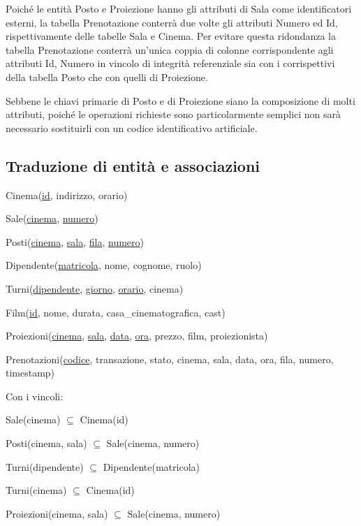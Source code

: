 Poiché le entità Posto e Proiezione hanno gli attributi di Sala come
identificatori esterni, la tabella Prenotazione conterrà due volte gli attributi
Numero ed Id, rispettivamente delle tabelle Sala e Cinema.
Per evitare questa ridondanza la tabella Prenotazione conterrà un'unica coppia
di colonne corrispondente agli attributi Id, Numero in vincolo di integrità
referenziale sia con i corrispettivi della tabella Posto che con quelli di
Proiezione.

Sebbene le chiavi primarie di Posto e di Proiezione siano la composizione di
molti attributi, poiché le operazioni richieste sono particolarmente semplici
non sarà necessario sostituirli con un codice identificativo artificiale.

\pagebreak
\subsection*{Traduzione di entità e associazioni}
%
%

Cinema(\underline{id}, indirizzo, orario)

Sale(\underline{cinema}, \underline{numero})

Posti(\underline{cinema},
\underline{sala},
\underline{fila},
\underline{numero})

Dipendente(\underline{matricola}, nome, cognome, ruolo)

Turni(\underline{dipendente}, \underline{giorno}, \underline{orario}, cinema)

Film(\underline{id}, nome, durata, casa\_cinematografica, cast)

Proiezioni(\underline{cinema},
\underline{sala},
\underline{data},
\underline{ora},
prezzo,
film,
proiezionista)

Prenotazioni(\underline{codice},
transazione,
stato,
cinema,
sala,
data,
ora,
fila,
numero,
timestamp)

\quad Con i vincoli:

Sale(cinema) $\subseteq$ Cinema(id)

Posti(cinema, sala) $\subseteq$ Sale(cinema, numero)

Turni(dipendente) $\subseteq$ Dipendente(matricola)

Turni(cinema) $\subseteq$ Cinema(id)

Proiezioni(cinema, sala) $\subseteq$ Sale(cinema, numero)


